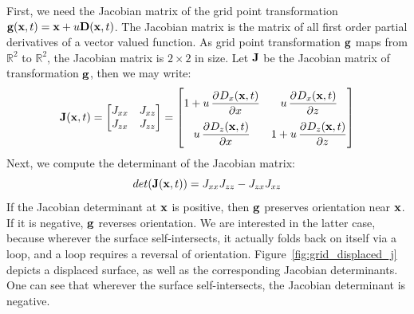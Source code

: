 %
First, we need the Jacobian matrix of the grid point transformation 
$\mathbf{g}(\mathbf{x},t)=\mathbf{x}+u\mathbf{D}(\mathbf{x},t)$. The Jacobian matrix is 
the matrix of all first order partial derivatives of a vector valued function. 
As grid point transformation $\mathbf{g}$ maps from $\mathbb{R}^2$ to 
$\mathbb{R}^2$, the Jacobian matrix is $2\times 2$ in size. Let $\mathbf{J}$ be 
the Jacobian matrix of transformation $\mathbf{g}$, then we may write:
%
\begin{equation*}
 \label{eq:jacobian_of_displacement}
 \mvec{J}(\mvec{x},t) =
 \begin{bmatrix}
 J_{xx} & J_{xz} \\
 J_{zx} & J_{zz}
 \end{bmatrix}
 =
 \begin{bmatrix}
   1 + u\dpd{D_x(\mvec{x},t)}{x} & u\dpd{D_x(\mvec{x},t)}{z} \\[1em]
   u\dpd{D_z(\mvec{x},t)}{x} & 1 + u\dpd{D_z(\mvec{x},t)}{z}
 \end{bmatrix}
\end{equation*}
Next, we compute the determinant of the Jacobian matrix:
\begin{equation*}
 det(\mathbf{J}(\mathbf{x},t)) = J_{xx}J_{zz}-J_{zx}J_{xz}
\end{equation*}
%
If the Jacobian determinant at $\mathbf{x}$ is positive, then $\mathbf{g}$ 
preserves orientation near $\mathbf{x}$. If it is negative, $\mathbf{g}$ reverses 
orientation. We are interested in the latter case, because wherever the 
surface self-intersects, it actually folds back on itself via a loop, and a 
loop requires a reversal of orientation. Figure~\ref{fig:grid_displaced_j} 
depicts a displaced surface, as well as the corresponding Jacobian 
determinants. One can see that wherever the surface self-intersects, the 
Jacobian determinant is negative.


